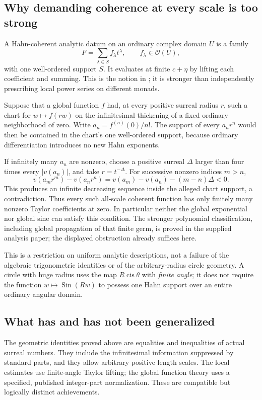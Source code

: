\documentclass[11pt,letterpaper]{article}
\theoremstyle{definition}
\theoremstyle{remark}
\newcommand{\cis}{\operatorname{cis}}
\newcommand{\Sin}{\operatorname{Sin}}
\numberwithin{equation}{section}
\begin{document}
\subsection{Why demanding coherence at every scale is too strong}
A Hahn-coherent analytic datum on an ordinary complex domain $U$ is a family
\[
 F=\sum_{\lambda\in S}f_\lambda t^\lambda,
 \qquad f_\lambda\in\mathcal O(U),
\]
with one well-ordered support $S$. It evaluates at finite $c+\eta$ by lifting each coefficient and summing. This is the notion in \cite{InputAnalysis}; it is stronger than independently prescribing local power series on different monads.

Suppose that a global function $f$ had, at every positive surreal radius $r$, such a chart for $w\mapsto f(rw)$ on the infinitesimal thickening of a fixed ordinary neighborhood of zero. Write $a_n=f^{(n)}(0)/n!$. The support of every $a_nr^n$ would then be contained in the chart's one well-ordered support, because ordinary differentiation introduces no new Hahn exponents.

If infinitely many $a_n$ are nonzero, choose a positive surreal $\Delta$ larger than four times every $|v(a_n)|$, and take $r=t^{-\Delta}$. For successive nonzero indices $m>n$,
\[
 v(a_mr^m)-v(a_nr^n)
 =v(a_m)-v(a_n)-(m-n)\Delta<0.
\]
This produces an infinite decreasing sequence inside the alleged chart support, a contradiction. Thus every such all-scale coherent function has only finitely many nonzero Taylor coefficients at zero. In particular neither the global exponential nor global sine can satisfy this condition. The stronger polynomial classification, including global propagation of that finite germ, is proved in the supplied analysis paper; the displayed obstruction already suffices here.

This is a restriction on uniform analytic descriptions, not a failure of the algebraic trigonometric identities or of the arbitrary-radius circle geometry. A circle with huge radius uses the map $R\cis\theta$ with \emph{finite angle}; it does not require the function $w\mapsto\Sin(Rw)$ to possess one Hahn support over an entire ordinary angular domain.

\subsection{What has and has not been generalized}
The geometric identities proved above are equalities and inequalities of actual surreal numbers. They include the infinitesimal information suppressed by standard parts, and they allow arbitrary positive length scales. The local estimates use finite-angle Taylor lifting; the global function theory uses a specified, published integer-part normalization. These are compatible but logically distinct achievements.
\end{document}
